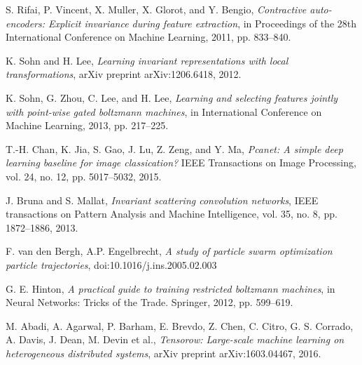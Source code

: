 \documentclass[conference]{IEEEtran}
\begin{document}
\begin{thebibliography}{}
S. Rifai, P. Vincent, X. Muller, X. Glorot, and Y. Bengio, \emph{Contractive auto-encoders: Explicit invariance during feature extraction}, in Proceedings of the 28th International Conference on Machine Learning, 2011, pp. 833–840.

K. Sohn and H. Lee, \emph{Learning invariant representations with local transformations}, arXiv preprint arXiv:1206.6418, 2012.

K. Sohn, G. Zhou, C. Lee, and H. Lee, \emph{Learning and selecting features jointly with point-wise gated boltzmann machines}, in International Conference on Machine Learning, 2013, pp. 217–225.

T.-H. Chan, K. Jia, S. Gao, J. Lu, Z. Zeng, and Y. Ma, \emph{Pcanet: A simple deep learning baseline for image classication?} IEEE Transactions on Image Processing, vol. 24, no. 12, pp. 5017–5032, 2015.

J. Bruna and S. Mallat, \emph{Invariant scattering convolution networks}, IEEE transactions on Pattern Analysis and Machine Intelligence, vol. 35, no. 8, pp. 1872–1886, 2013.

F. van den Bergh, A.P. Engelbrecht, \emph{A study of particle swarm optimization particle trajectories}, doi:10.1016/j.ins.2005.02.003

G. E. Hinton, \emph{A practical guide to training restricted boltzmann machines}, in Neural Networks: Tricks of the Trade. Springer, 2012, pp. 599–619.

M. Abadi, A. Agarwal, P. Barham, E. Brevdo, Z. Chen, C. Citro, G. S. Corrado, A. Davis, J. Dean, M. Devin et al., \emph{Tensorow: Large-scale machine learning on heterogeneous distributed systems}, arXiv preprint arXiv:1603.04467, 2016.

\end{thebibliography}




\end{document}
